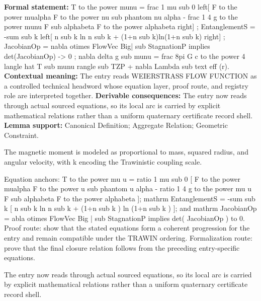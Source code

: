 \begingroup\footnotesize\setlength{\emergencystretch}{3em}\sloppy
\textbf{Formal statement:} T to the power munu = frac 1 mu sub 0 left[ F to the power mualpha F to the power nu sub phantom nu alpha - frac 1 4 g to the power munu F sub alphabeta F to the power alphabeta right] ; EntanglementS = -sum sub k left[ n sub k ln n sub k + (1+n sub k)ln(1+n sub k) right] ; JacobianOp = nabla otimes FlowVec Big| sub StagnationP implies det(JacobianOp) -> 0 ; nabla delta g sub munu = frac 8pi G c to the power 4 langle hat T sub munu rangle sub TZP + nabla Lambda sub text eff (r). \textbf{Contextual meaning:} The entry reads WEIERSTRASS FLOW FUNCTION as a controlled technical headword whose equation layer, proof route, and registry role are interpreted together. \textbf{Derivable consequences:} The entry now reads through actual sourced equations, so its local arc is carried by explicit mathematical relations rather than a uniform quaternary certificate record shell. \textbf{Lemma support:} Canonical Definition; Aggregate Relation; Geometric Constraint.\par
\endgroup

The magnetic moment is modeled as proportional to mass, squared radius, and angular velocity, with k encoding the Trawinistic coupling scale.

Equation anchors: T to the power mu u = ratio 1 mu sub 0 [ F to the power mualpha F to the power u sub phantom u alpha - ratio 1 4 g to the power mu u F sub alphabeta F to the power alphabeta ]; mathrm EntanglementS = -sum sub k [ n sub k ln n sub k + (1+n sub k ) ln (1+n sub k ) ]; and mathrm JacobianOp = abla otimes FlowVec Big | sub StagnationP implies det( JacobianOp ) to 0. Proof route: show that the stated equations form a coherent progression for the entry and remain compatible under the TRAWIN ordering. Formalization route: prove that the final closure relation follows from the preceding entry-specific equations.

The entry now reads through actual sourced equations, so its local arc is carried by explicit mathematical relations rather than a uniform quaternary certificate record shell.
\endgroup

